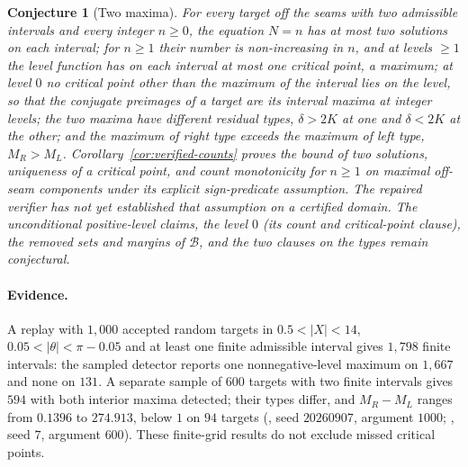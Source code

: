 \documentclass[11pt]{article}
\newtheorem{conjecture}[theorem]{Conjecture}
\theoremstyle{remark}
\begin{document}
\begin{conjecture}[Two maxima]\label{conj:two-maxima}
For every target off the seams with two admissible intervals and every
integer $n\ge0$, the equation $N=n$ has at most two solutions on each
interval; for $n\ge1$ their number is non-increasing in $n$, and at levels $\ge1$
the level function has on each interval at most one critical point, a
maximum; at level $0$ no critical point other than the maximum of the
interval lies on the level, so that the conjugate preimages of a target
are its interval maxima at integer levels; the two maxima have different
residual types, $\delta>2K$ at one and $\delta<2K$ at the other; and the
maximum of right type exceeds the maximum of left type, $M_R>M_L$.
Corollary~\ref{cor:verified-counts} proves the bound of two solutions,
uniqueness of a critical point, and count monotonicity for $n\ge1$
on maximal off-seam components under its explicit sign-predicate
assumption.  The repaired verifier has not yet established that
assumption on a certified domain.  The unconditional positive-level
claims, the level $0$ (its count and critical-point clause),
the removed sets and margins of $\mathcal B$,
and the two clauses on the types remain conjectural.
\end{conjecture}

\paragraph{Evidence.}  A replay with $1{,}000$ accepted random targets
in $0.5<|X|<14$, $0.05<|\theta|<\pi-0.05$ and at least one finite
admissible interval gives $1{,}798$ finite intervals: the sampled detector
reports one nonnegative-level maximum on $1{,}667$ and none on $131$.
A separate sample of $600$ targets with two finite intervals gives $594$
with both interior maxima detected; their types differ, and $M_R-M_L$
ranges from $0.1396$ to $274.913$, below $1$ on $94$ targets
(, seed $20260907$, argument $1000$;
, seed $7$, argument $600$).
These finite-grid results do not exclude missed critical points.
\end{document}
